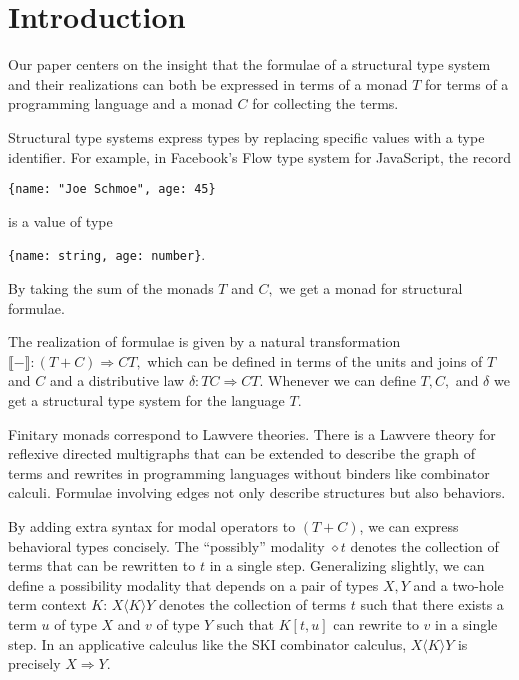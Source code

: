 \documentclass[sigplan,9pt,review,anonymous]{acmart}\settopmatter{printfolios=true,printccs=false,printacmref=false}
\newcommand{\maps}{\colon}
\newcommand{\interp}[1]{\llbracket #1 \rrbracket}
\begin{document}
\section{Introduction}

Our paper centers on the insight that the formulae of a structural type system and their realizations can both be expressed in terms of a monad $T$ for terms of a programming language and a monad $C$ for collecting the terms.

Structural type systems express types by replacing specific values with a type identifier.  For example, in Facebook's Flow type system for JavaScript, the record
\begin{center}{\tt \{name: "Joe Schmoe", age: 45\}}\end{center}
is a value of type
\begin{center}{\tt \{name: string, age: number\}}.\end{center}
By taking the sum of the monads $T$ and $C,$ we get a monad for structural formulae.

The realization of formulae is given by a natural transformation ${\interp{-}\maps (T+C)\Rightarrow CT,}$ which can be defined in terms of the units and joins of $T$ and $C$ and a distributive law ${\delta\maps TC \Rightarrow CT.}$  Whenever we can define $T, C,$ and $\delta$ we get a structural type system for the language $T.$

Finitary monads correspond to Lawvere theories.  There is a Lawvere theory for reflexive directed multigraphs that can be extended to describe the graph of terms and rewrites in programming languages without binders like combinator calculi.  Formulae involving edges not only describe structures but also behaviors.

By adding extra syntax for modal operators to $(T+C)$, we can express behavioral types concisely.  The ``possibly'' modality $\diamond t$ denotes the collection of terms that can be rewritten to $t$ in a single step.  Generalizing slightly, we can define a possibility modality that depends on a pair of types $X, Y$ and a two-hole term context $K$: $X\langle K \rangle Y$ denotes the collection of terms $t$ such that there exists a term $u$ of type $X$ and $v$ of type $Y$ such that $K[t, u]$ can rewrite to $v$ in a single step.  In an applicative calculus like the SKI combinator calculus, $X\langle K \rangle Y$ is precisely $X \Rightarrow Y.$
\end{document}
